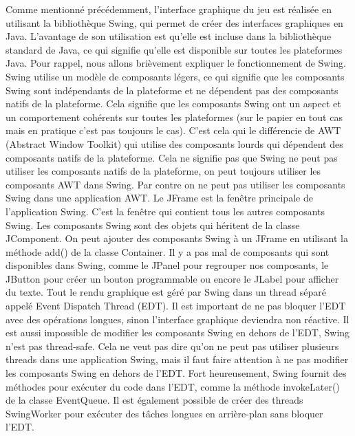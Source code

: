 \documentclass{article}
\begin{document}
    Comme mentionné précédemment, l'interface graphique du jeu est réalisée en utilisant la bibliothèque Swing, qui permet de créer des interfaces graphiques en Java.
    L'avantage de son utilisation est qu'elle est incluse dans la bibliothèque standard de Java, ce qui signifie qu'elle est disponible sur toutes les plateformes Java.
    Pour rappel, nous allons brièvement expliquer le fonctionnement de Swing.
    \newline
    Swing utilise un modèle de composants légers, ce qui signifie que les composants Swing sont indépendants de la plateforme et ne dépendent pas des composants natifs de la plateforme.
    Cela signifie que les composants Swing ont un aspect et un comportement cohérents sur toutes les plateformes (sur le papier en tout cas mais en pratique c'est pas toujours le cas).
    C'est cela qui le différencie de AWT (Abstract Window Toolkit) qui utilise des composants lourds qui dépendent des composants natifs de la plateforme.
    Cela ne signifie pas que Swing ne peut pas utiliser les composants natifs de la plateforme, on peut toujours utiliser les composants AWT dans Swing.
    Par contre on ne peut pas utiliser les composants Swing dans une application AWT.
    Le JFrame est la fenêtre principale de l'application Swing. C'est la fenêtre qui contient tous les autres composants Swing.
    Les composants Swing sont des objets qui héritent de la classe JComponent.
    On peut ajouter des composants Swing à un JFrame en utilisant la méthode add() de la classe Container.
    Il y a pas mal de composants qui sont disponibles dans Swing, comme le JPanel pour regrouper nos composants, le JButton pour créer un bouton programmable ou encore le JLabel pour afficher du texte.
    \newline
    Tout le rendu graphique est géré par Swing dans un thread séparé appelé Event Dispatch Thread (EDT).
    Il est important de ne pas bloquer l'EDT avec des opérations longues, sinon l'interface graphique deviendra non réactive.
    Il est aussi impossible de modifier les composants Swing en dehors de l'EDT, Swing n'est pas thread-safe.
    Cela ne veut pas dire qu'on ne peut pas utiliser plusieurs threads dans une application Swing, mais il faut faire attention à ne pas modifier les composants Swing en dehors de l'EDT.
    Fort heureusement, Swing fournit des méthodes pour exécuter du code dans l'EDT, comme la méthode invokeLater() de la classe EventQueue.
    Il est également possible de créer des threads SwingWorker pour exécuter des tâches longues en arrière-plan sans bloquer l'EDT.
\end{document}
